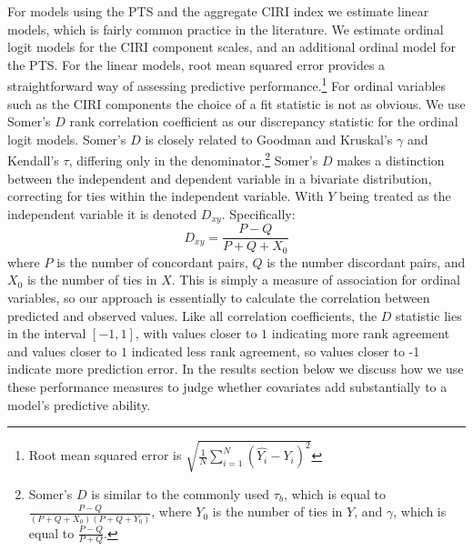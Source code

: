 \documentclass[12pt]{article}
\begin{document}
For models using the PTS and the aggregate CIRI index we estimate linear models, which is fairly common practice in the literature. We estimate ordinal logit models for the CIRI component scales, and an additional ordinal model for the PTS. For the linear models, root mean squared error provides a straightforward way of assessing predictive performance.\footnote{Root mean squared error is $\displaystyle \sqrt{\frac{1}{N} \sum\limits_{i=1}^N (\hat{Y_{i}} - Y_{i})^2} $} For ordinal variables such as the CIRI components the choice of a fit statistic is not as obvious. We use Somer's $D$ rank correlation coefficient  \citep{Somers1962} as our discrepancy statistic for the ordinal logit models.
Somer's $D$ is closely related to Goodman and Kruskal's $\gamma$ and Kendall's $\tau$, differing only in the denominator.\footnote{Somer's $D$ is similar to the commonly used $\tau_b$, which is equal to $\frac{P - Q}{(P+Q+X_0)(P+Q+Y_0)}$, where $Y_0$ is the number of ties in $Y$, and $\gamma$, which is equal to $\frac{P - Q}{P + Q}$.} Somer's $D$ makes a distinction between the independent and dependent variable in a bivariate distribution, correcting for ties within the independent variable. With $Y$ being treated as the independent variable it is denoted $D_{xy}$. 
Specifically:
$$D_{xy} = \frac{P - Q}{P + Q + X_0}$$
\noindent where $P$ is the number of concordant pairs, $Q$ is the number discordant pairs, and $X_0$ is the number of ties in $X$. This is simply a measure of association for ordinal variables, so our approach is essentially to calculate the correlation between predicted and observed values. Like all correlation coefficients, the $D$ statistic lies in the interval $[-1, 1]$, with values closer to $1$ indicating more rank agreement and values closer to $1$ indicated less rank agreement, so values closer to -1 indicate more prediction error. In the results section below we discuss how we use these performance measures to judge whether covariates add substantially to a model's predictive ability.
\end{document}

